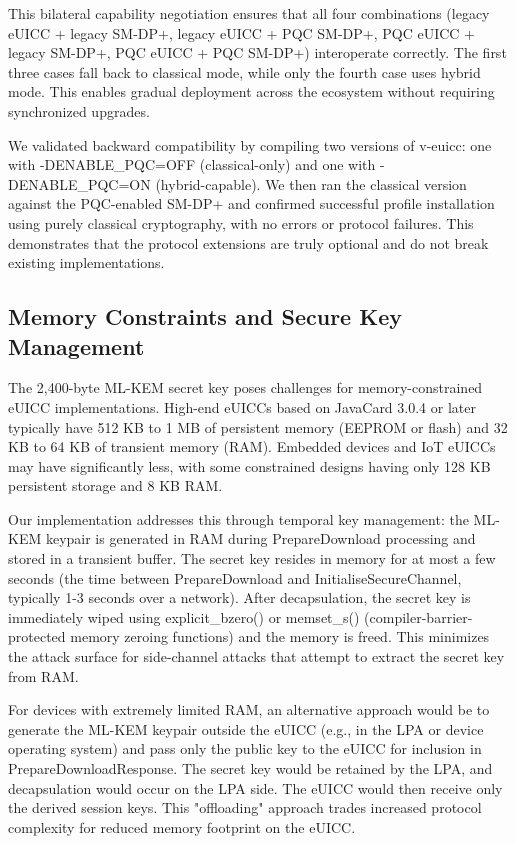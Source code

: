 \documentclass{easychair}
\begin{document}
This bilateral capability negotiation ensures that all four combinations (legacy eUICC + legacy SM-DP+, legacy eUICC + PQC SM-DP+, PQC eUICC + legacy SM-DP+, PQC eUICC + PQC SM-DP+) interoperate correctly. The first three cases fall back to classical mode, while only the fourth case uses hybrid mode. This enables gradual deployment across the ecosystem without requiring synchronized upgrades.

We validated backward compatibility by compiling two versions of v-euicc: one with -DENABLE\_PQC=OFF (classical-only) and one with -DENABLE\_PQC=ON (hybrid-capable). We then ran the classical version against the PQC-enabled SM-DP+ and confirmed successful profile installation using purely classical cryptography, with no errors or protocol failures. This demonstrates that the protocol extensions are truly optional and do not break existing implementations.

\subsection{Memory Constraints and Secure Key Management}

The 2,400-byte ML-KEM secret key poses challenges for memory-constrained eUICC implementations. High-end eUICCs based on JavaCard 3.0.4 or later typically have 512 KB to 1 MB of persistent memory (EEPROM or flash) and 32 KB to 64 KB of transient memory (RAM). Embedded devices and IoT eUICCs may have significantly less, with some constrained designs having only 128 KB persistent storage and 8 KB RAM.

Our implementation addresses this through temporal key management: the ML-KEM keypair is generated in RAM during PrepareDownload processing and stored in a transient buffer. The secret key resides in memory for at most a few seconds (the time between PrepareDownload and InitialiseSecureChannel, typically 1-3 seconds over a network). After decapsulation, the secret key is immediately wiped using explicit\_bzero() or memset\_s() (compiler-barrier-protected memory zeroing functions) and the memory is freed. This minimizes the attack surface for side-channel attacks that attempt to extract the secret key from RAM.

For devices with extremely limited RAM, an alternative approach would be to generate the ML-KEM keypair outside the eUICC (e.g., in the LPA or device operating system) and pass only the public key to the eUICC for inclusion in PrepareDownloadResponse. The secret key would be retained by the LPA, and decapsulation would occur on the LPA side. The eUICC would then receive only the derived session keys. This "offloading" approach trades increased protocol complexity for reduced memory footprint on the eUICC.
\end{document}
